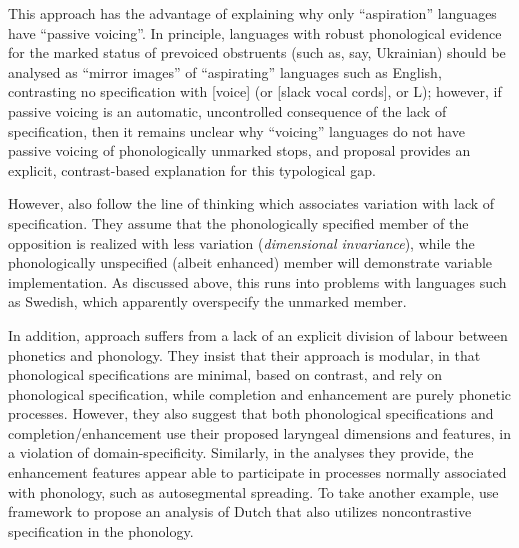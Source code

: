This approach has the advantage of explaining why only \enquote{aspiration} languages have \enquote{passive voicing}. In principle, languages with robust phonological evidence for the marked status of prevoiced obstruents (such as, say, Ukrainian) should be analysed as \enquote{mirror images} of \enquote{aspirating} languages such as English, contrasting no specification with [voice] (or [slack vocal cords], or L); however, if passive voicing is an automatic, uncontrolled consequence of the lack of specification, then it remains unclear why \enquote{voicing} languages do not have passive voicing of phonologically unmarked stops, and  proposal provides an explicit, contrast\hyp based explanation for this typological gap.

However, \citet{avery01:_laryn} also follow the line of thinking which associates variation with lack of specification. They assume that the phonologically specified member of the opposition is realized with less variation (\emph{dimensional invariance}), while the phonologically unspecified (albeit enhanced) member will demonstrate variable implementation. As discussed above, this runs into problems with languages such as Swedish, which apparently overspecify the unmarked member.

In addition,  approach suffers from a lack of an explicit division of labour between phonetics and phonology. They insist that their approach is modular, in that phonological specifications are minimal, based on contrast, and rely on phonological specification, while completion and enhancement are purely phonetic processes. However, they also suggest that both phonological specifications and completion\fshyp enhancement use their proposed laryngeal dimensions and features, in a violation of domain\hyp specificity. Similarly, in the analyses they provide, the enhancement features appear able to participate in processes normally associated with phonology, such as autosegmental spreading. To take another example, \citet{iverson03:_legac_dutch} use  framework to propose an analysis of Dutch that also utilizes noncontrastive specification in the phonology.

